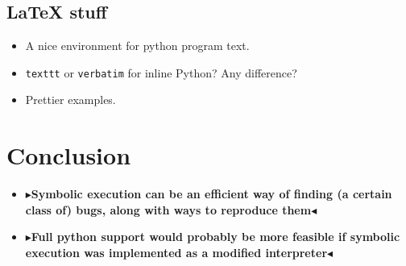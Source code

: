 \documentclass[11pt]{report}
\newcommand{\todo}[1]{{\color[rgb]{.5,0,0}\textbf{$\blacktriangleright$#1$\blacktriangleleft$}}}
\begin{document}
\section{\LaTeX{} stuff}

\begin{itemize}
  \item A nice environment for python program text.
  \item {\tt texttt} or \verb|verbatim| for inline Python? Any
    difference?
  \item Prettier examples.
\end{itemize}


\chapter{Conclusion}
\label{ch:conclusion}

\begin{itemize}
\item \todo{Symbolic execution can be an efficient way of finding (a
  certain class of) bugs, along with ways to reproduce them}
\item \todo{Full python support would probably be more feasible if
  symbolic execution was implemented as a modified interpreter}
\end{itemize}
\end{document}

